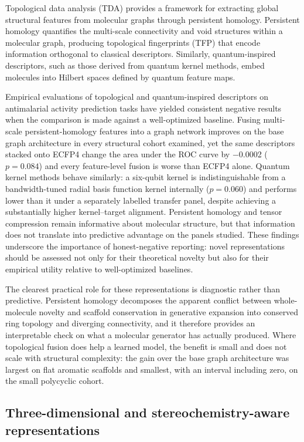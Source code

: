 Topological data analysis (TDA) provides a framework for extracting global structural features from molecular graphs through persistent homology. Persistent homology quantifies the multi-scale connectivity and void structures within a molecular graph, producing topological fingerprints (TFP) that encode information orthogonal to classical descriptors. Similarly, quantum-inspired descriptors, such as those derived from quantum kernel methods, embed molecules into Hilbert spaces defined by quantum feature maps.

Empirical evaluations of topological and quantum-inspired descriptors on antimalarial activity prediction tasks have yielded consistent negative results when the comparison is made against a well-optimized baseline. Fusing multi-scale persistent-homology features into a graph network improves on the base graph architecture in every structural cohort examined, yet the same descriptors stacked onto ECFP4 change the area under the ROC curve by \num{-0.0002} ($p = \num{0.084}$) and every feature-level fusion is worse than ECFP4 alone. Quantum kernel methods behave similarly: a six-qubit kernel is indistinguishable from a bandwidth-tuned radial basis function kernel internally ($p = \num{0.060}$) and performs lower than it under a separately labelled transfer panel, despite achieving a substantially higher kernel--target alignment. Persistent homology and tensor compression remain informative about molecular structure, but that information does not translate into predictive advantage on the panels studied. These findings underscore the importance of honest-negative reporting: novel representations should be assessed not only for their theoretical novelty but also for their empirical utility relative to well-optimized baselines.

The clearest practical role for these representations is diagnostic rather than predictive. Persistent homology decomposes the apparent conflict between whole-molecule novelty and scaffold conservation in generative expansion into conserved ring topology and diverging connectivity\cite{Temgoua2026Topological}, and it therefore provides an interpretable check on what a molecular generator has actually produced. Where topological fusion does help a learned model, the benefit is small and does not scale with structural complexity: the gain over the base graph architecture was largest on flat aromatic scaffolds and smallest, with an interval including zero, on the small polycyclic cohort.

\subsection{Three-dimensional and stereochemistry-aware representations}

